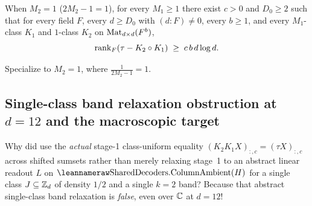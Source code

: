 \begin{corollary}\label{cor:2b-m2-one}
When $M_2 = 1$ ($2M_2 - 1 = 1$), for every $M_1 \ge 1$ there exist $c > 0$ and $D_0 \ge 2$ such
that for every field $F$, every $d \ge D_0$ with $(d : F) \ne 0$, every $b \ge 1$, and every
$M_1$-class $K_1$ and $1$-class $K_2$ on $\operatorname{Mat}_{d\times d}(F^b)$,
\[
  \operatorname{rank}_F(\tau - K_2 \circ K_1) \;\ge\; c\,b\,d\log d.
\]
\end{corollary}
\begin{outline}
Specialize  to $M_2 = 1$, where $\frac{1}{2M_2 - 1} = 1$.
\end{outline}

\subsection{Single-class band relaxation obstruction at \texorpdfstring{$d = 12$}{d = 12} and the macroscopic target}\label{sec:d12-band}

Why did  use the \emph{actual} stage-1 class-uniform equality
$(K_2 K_1 X)_{:,c} = (\tau X)_{:,c}$ across shifted sumsets rather than merely relaxing stage~1 to
an abstract linear readout $L$ on $\leanname{SharedDecoders.ColumnAmbient}(H)$ for a single class
$J \subseteq \mathbb{Z}_d$ of density $1/2$ and a single $k = 2$ band? Because that abstract single-class
band relaxation is \emph{false}, even over $\mathbb{C}$ at $d = 12$!


